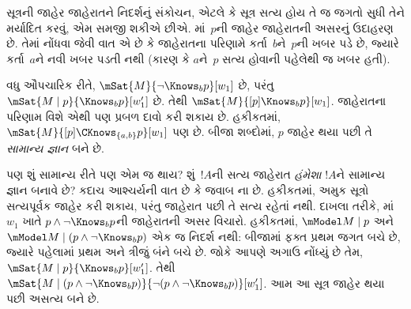 સૂત્રની જાહેર જાહેરાતને નિદર્શનું સંકોચન, એટલે કે
સૂત્ર સત્ય હોય તે જ જગતો સુધી તેને મર્યાદિત કરવું,
એમ સમજી શકીએ છીએ. માં~$p$ની
જાહેર જાહેરાતની અસરનું ઉદાહરણ છે. તેમાં નોંધવા જેવી વાત એ છે
કે જાહેરાતના પરિણામે કર્તા~$b$ને~$p$ની ખબર પડે છે, જ્યારે
કર્તા~$a$ને નવી ખબર પડતી નથી (કારણ કે $a$ને~$p$ સત્ય હોવાની
પહેલેથી જ ખબર હતી).

વધુ ઔપચારિક રીતે, $\mSat{M}{\lnot \Knows_b p}[w_1]$ છે,
પરંતુ $\mSat{M \mid p}{\Knows_b p}[w'_1]$ છે. તેથી
$\mSat{M}{[p] \Knows_b p}[w_1]$. જાહેરાતના પરિણામ વિશે
એથી પણ પ્રબળ દાવો કરી શકાય છે. હકીકતમાં,
$\mSat{M}{[p]\CKnows_{\{a,b\}} p}[w_1]$ પણ છે. બીજા શબ્દોમાં,
$p$ જાહેર થયા પછી તે \emph{સામાન્ય જ્ઞાન} બને છે.

પણ શું સામાન્ય રીતે પણ એમ જ થાય? શું~$!A$ની સત્ય જાહેરાત
\emph{હંમેશા} $!A$ને સામાન્ય જ્ઞાન બનાવે છે? કદાચ આશ્ચર્યની વાત
છે કે જવાબ ના છે. હકીકતમાં, અમુક સૂત્રો સત્યપૂર્વક
જાહેર કરી શકાય, પરંતુ જાહેરાત પછી તે સત્ય રહેતાં નથી. દાખલા
તરીકે, માં~$w_1$ ખાતે
$p \land \lnot \Knows_b p$ની જાહેરાતની અસર વિચારો.
હકીકતમાં, $\mModel M \mid p$ અને
$\mModel M \mid (p \land \lnot \Knows_b p)$ એક જ નિદર્શ
નથી: બીજામાં ફક્ત પ્રથમ જગત બચે છે, જ્યારે પહેલામાં પ્રથમ
અને ત્રીજું બંને બચે છે. જોકે આપણે અગાઉ નોંધ્યું છે તેમ,
$\mSat{M \mid p}{\Knows_b p}[w'_1]$. તેથી
$\mSat{M \mid (p \land \lnot \Knows_b p)}{\lnot
(p \land \lnot \Knows_b p)}[w'_1]$. આમ આ સૂત્ર
જાહેર થયા પછી અસત્ય બને છે.
\endgroup



\OLEndPartHook
\endgroup


\OLEndPartHook
